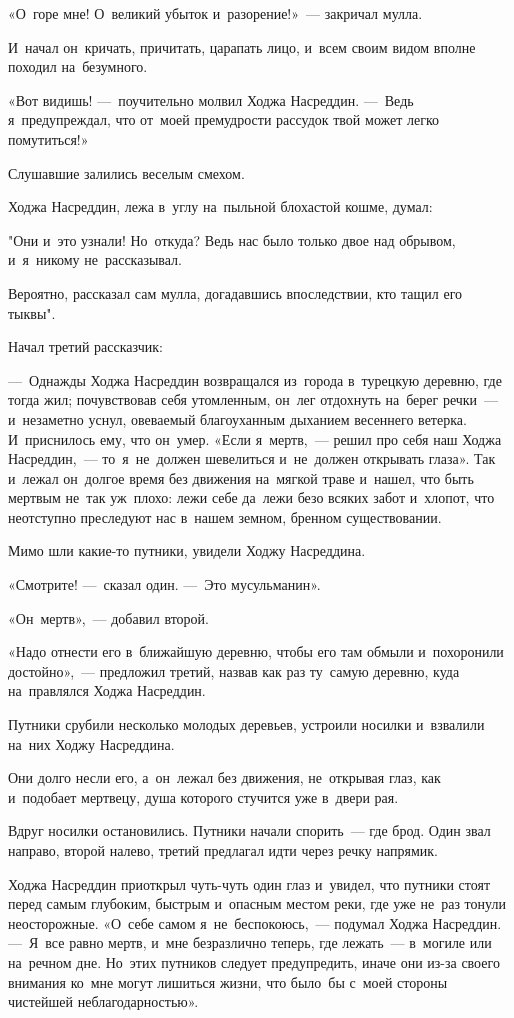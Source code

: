 \documentclass[12pt,a4paper]{book}
\begin{document}
«О~горе мне! О~великий убыток и~разорение!»~— закричал мулла.

И~начал он~кричать, причитать, царапать лицо, и~всем своим видом вполне походил на~безумного.

«Вот видишь! —~поучительно молвил Ходжа Насреддин. —~Ведь я~предупреждал, что от~моей премудрости рассудок твой может легко помутиться!»

Слушавшие залились веселым смехом.

Ходжа Насреддин, лежа в~углу на~пыльной блохастой кошме, думал:

"Они и~это узнали! Но~откуда? Ведь нас было только двое над обрывом, и~я~никому не~рассказывал.

Вероятно, рассказал сам мулла, догадавшись впоследствии, кто тащил его тыквы".

Начал третий рассказчик:

—~Однажды Ходжа Насреддин возвращался из~города в~турецкую деревню, где тогда жил; почувствовав себя утомленным, он~лег отдохнуть на~берег речки~— и~незаметно уснул, овеваемый благоуханным дыханием весеннего ветерка. И~приснилось ему, что он~умер. «Если я~мертв,~— решил про себя наш Ходжа Насреддин,~— то~я~не~должен шевелиться и~не~должен открывать глаза». Так и~лежал он~долгое время без движения на~мягкой траве и~нашел, что быть мертвым не~так уж~плохо: лежи себе да~лежи безо всяких забот и~хлопот, что неотступно преследуют нас в~нашем земном, бренном существовании.

Мимо шли какие-то путники, увидели Ходжу Насреддина.

«Смотрите! —~сказал один. —~Это мусульманин».

«Он~мертв»,~— добавил второй.

«Надо отнести его в~ближайшую деревню, чтобы его там обмыли и~похоронили достойно»,~— предложил третий, назвав как раз ту~самую деревню, куда на~правлялся Ходжа Насреддин.

Путники срубили несколько молодых деревьев, устроили носилки и~взвалили на~них Ходжу Насреддина.

Они долго несли его, а~он~лежал без движения, не~открывая глаз, как и~подобает мертвецу, душа которого стучится уже в~двери рая.

Вдруг носилки остановились. Путники начали спорить~— где брод. Один звал направо, второй налево, третий предлагал идти через речку напрямик.

Ходжа Насреддин приоткрыл чуть-чуть один глаз и~увидел, что путники стоят перед самым глубоким, быстрым и~опасным местом реки, где уже не~раз тонули неосторожные. «О~себе самом я~не~беспокоюсь,~— подумал Ходжа Насреддин. —~Я~все равно мертв, и~мне безразлично теперь, где лежать~— в~могиле или на~речном дне. Но~этих путников следует предупредить, иначе они из-за своего внимания ко~мне могут лишиться жизни, что было~бы с~моей стороны чистейшей неблагодарностью».
\end{document}
